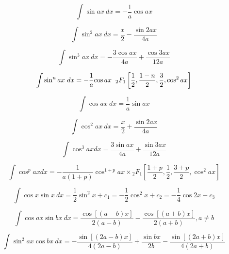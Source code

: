 \begin{equation}
\int \sin ax \ dx = -\frac{1}{a} \cos ax 
\end{equation}

\begin{equation}
\int \sin^2 ax\  dx = \frac{x}{2} - \frac{\sin 2ax} {4a} 
\end{equation}

\begin{equation}
\int \sin^3 ax \ dx = -\frac{3 \cos ax}{4a} + \frac{\cos 3ax} {12a} 
\end{equation}

\begin{equation}
\int \sin^n ax \ dx =
 -\frac{1}{a}{\cos ax} \hspace{2mm}{_2F_1}\left[
\frac{1}{2}, \frac{1-n}{2}, \frac{3}{2}, \cos^2 ax
\right] 
\end{equation}



\begin{equation}
\int \cos ax\ dx= \frac{1}{a} \sin ax 
\end{equation}

\begin{equation}
\int \cos^2 ax\ dx = \frac{x}{2}+\frac{ \sin 2ax}{4a} 
\end{equation}

\begin{equation}
\int \cos^3 ax dx = \frac{3 \sin ax}{4a}+\frac{ \sin 3ax}{12a} 
\end{equation}

\begin{equation}
\int \cos^p ax dx  = -\frac{1}{a(1+p)}{\cos^{1+p} ax} \times 
{_2F_1}\left[
\frac{1+p}{2}, \frac{1}{2}, \frac{3+p}{2}, \cos^2 ax
\right] 
\end{equation}

\begin{equation}\label{eq:veky}
\int \cos x \sin x\ dx = \frac{1}{2}\sin^2 x + c_1 = -\frac{1}{2} \cos^2x + c_2 = -\frac{1}{4} \cos 2x + c_3
\end{equation}

\begin{equation}
\int \cos ax \sin bx\ dx = \frac{\cos[(a-b) x]}{2(a-b)} -
 \frac{\cos[(a+b)x]}{2(a+b)} , a\ne b
\end{equation}

\begin{equation}
\int \sin^2 ax \cos bx\ dx = 
-\frac{\sin[(2a-b)x]}{4(2a-b)} 
+ \frac{\sin bx}{2b} 
- \frac{\sin[(2a+b)x]}{4(2a+b)}
\end{equation}

